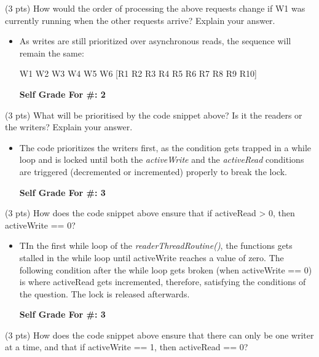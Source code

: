 \documentclass[conference]{IEEEtran}
\begin{document}
\begin{itemize}
(3 pts) How would the order of processing the above requests change if W1 was currently
running when the other requests arrive? Explain your answer.

\begin{itemize}
	\item As writes are still prioritized over asynchronous reads, the sequence will remain the same:
		\begin{center}
		W1 W2 W3 W4 W5 W6 [R1 R2 R3 R4 R5 R6 R7 R8 R9 R10]
	\end{center}
	\begin{center}
		\textbf{Self Grade For \#: 2}
	\end{center}
\end{itemize}

(3 pts) What will be prioritised by the code snippet above? Is it the readers or the writers?
Explain your answer.

\begin{itemize}
	\item The code prioritizes the writers first, as the condition gets trapped in a while loop and is locked until both the \textit{activeWrite} and the \textit{activeRead} conditions are triggered (decremented or incremented) properly to break the lock.
	\begin{center}
		\textbf{Self Grade For \#: 3}
	\end{center}
\end{itemize}

(3 pts) How does the code snippet above ensure that if activeRead > 0, then
activeWrite == 0?

\begin{itemize}
	\item TIn the first while loop of the \textit{readerThreadRoutine()}, the functions gets stalled in the while loop until activeWrite reaches a value of zero. The following condition after the while loop gets broken (when activeWrite == 0) is where activeRead gets incremented, therefore, satisfying the conditions of the question. The lock is released afterwards.
	\begin{center}
		\textbf{Self Grade For \#: 3}
	\end{center}
\end{itemize}

(3 pts) How does the code snippet above ensure that there can only be one writer at a time,
and that if activeWrite == 1, then activeRead == 0?


\end{itemize}
\end{document}
